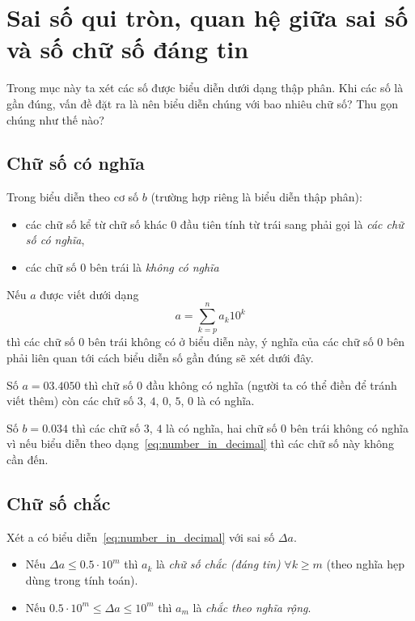 \documentclass[../../Lectures.tex]{subfiles}
\begin{document}
\section[Sai số quy tròn, quan hệ sai số \& số chữ số chắc]{Sai số qui tròn, quan hệ giữa sai số và số chữ số đáng tin}

Trong mục này ta xét các số được biểu diễn dưới dạng thập phân. Khi các số là
gần đúng, vấn đề đặt ra là nên biểu diễn chúng với bao nhiêu chữ số? Thu gọn
chúng như thế nào?

\subsection{Chữ số có nghĩa}

\begin{definition}
    Trong biểu diễn theo cơ số \(b\) (trường hợp riêng là biểu diễn thập phân):
    \begin{itemize}
        \item các chữ số kể từ chữ số khác \(0\) đầu tiên tính từ trái sang phải
            gọi là \emph{các chữ số có nghĩa},
        \item các chữ số \(0\) bên trái là \emph{không có nghĩa}
    \end{itemize}
\end{definition}

Nếu \(a\) được viết dưới dạng
\begin{equation} \label{eq:number_in_decimal}
    a = \sum_{k=p}^{n} a_k10^k
\end{equation}
thì các chữ số \(0\) bên trái không có ở biểu diễn này, ý nghĩa của các chữ số
\(0\) bên phải liên quan tới cách biểu diễn số gần đúng sẽ xét dưới đây.

\begin{exmp}
    Số \(a = 03.4050\) thì chữ số \(0\) đầu không có nghĩa (người ta có thể điền
    để tránh viết thêm) còn các chữ số \(3\), \(4\), \(0\), \(5\), \(0\) là có
    nghĩa.

    Số \(b = 0.034\) thì các chữ số \(3\), \(4\) là có nghĩa, hai chữ số \(0\)
    bên trái không có nghĩa vì nếu biểu diễn theo dạng~\ref{eq:number_in_decimal}
    thì các chữ số này không cần đến.
\end{exmp}

\subsection{Chữ số chắc}

\begin{definition}
    Xét a có biểu diễn~\ref{eq:number_in_decimal} với sai số \(\Delta a\).
    \begin{itemize}
        \item Nếu \(\Delta a \leq \num{0.5} \cdot 10^m\) thì \(a_k\) là
            \emph{chữ số chắc (đáng tin)} \(\forall k \geq m\) (theo nghĩa hẹp
            dùng trong tính toán).
        \item Nếu \(\num{0.5} \cdot 10^m \leq \Delta a \leq 10^m\) thì \(a_m\)
            là \emph{chắc theo nghĩa rộng}.
    \end{itemize}
\end{definition}
\end{document}
